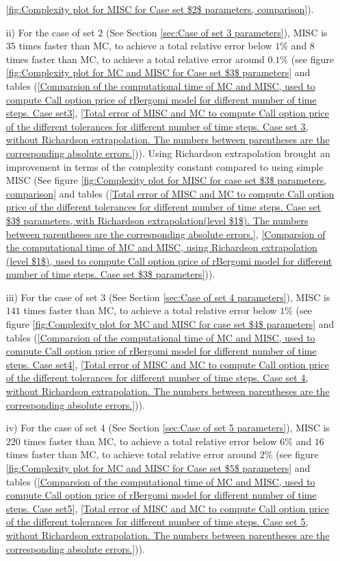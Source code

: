 \begin{enumerate}
\ref{fig:Complexity plot for  MISC for Case set $2$ parameters, comparison}).
		
		
		
		
			\item [ii)]  For the case of set $2$ (See Section \ref{sec:Case of set 3 parameters}), MISC is  $35$ times faster than MC, to achieve  a total relative error below $1\%$ and $8$ times faster than MC, to achieve a total relative error around $0.1\%$ (see figure \ref{fig:Complexity plot for MC and MISC for Case set $3$ parameters} and tables (\ref{Comparsion of the computational time of  MC and MISC, used to compute Call option price of rBergomi model for different number of time steps. Case set3}, \ref{Total error of MISC and MC to compute Call option price of the different tolerances for different number of time steps. Case set 3, without Richardson extrapolation. The numbers between parentheses are the corresponding absolute errors.})). Using Richardson extrapolation brought an improvement in terms of the  complexity constant compared to using simple MISC (See figure \ref{fig:Complexity plot for  MISC for case set $3$ parameters, comparison} and tables (\ref{Total  error of MISC and MC to compute Call option price of the different tolerances for different number of time steps. Case set $3$ parameters, with Richardson extrapolation(level $1$). The numbers between parentheses are the corresponding absolute errors.}, \ref{Comparsion of the computational time of  MC and MISC, using Richardson extrapolation (level $1$), used to compute Call option price of rBergomi model for different number of time steps. Case set $3$ parameters})).
				
	 	\item [iii)] For the case of set $3$ (See Section \ref{sec:Case of set 4 parameters}), MISC is  $141$ times faster than MC, to achieve a total relative error below $1\%$ (see figure \ref{fig:Complexity plot for MC and MISC for case set $4$ parameters} and tables (\ref{Comparsion of the computational time of  MC and MISC, used to compute Call option price of rBergomi model for different number of time steps. Case set4}, \ref{Total error of MISC and MC to compute Call option price of the different tolerances for different number of time steps. Case set 4, without Richardson extrapolation. The numbers between parentheses are the corresponding absolute errors.})).
		
	\item [iv)] For the case of set $4$ (See Section \ref{sec:Case of set 5 parameters}), MISC is  $220$ times faster than MC, to achieve a total relative error below $6\%$ and $16$ times faster than MC, to achieve total relative error around $2\%$  (see figure \ref{fig:Complexity plot for MC and MISC for Case set $5$ parameters} and tables (\ref{Comparsion of the computational time of  MC and MISC, used to compute Call option price of rBergomi model for different number of time steps. Case set5}, \ref{Total error of MISC and MC to compute Call option price of the different tolerances for different number of time steps. Case set 5, without Richardson extrapolation. The numbers between parentheses are the corresponding absolute errors.})).
		

\end{enumerate}
